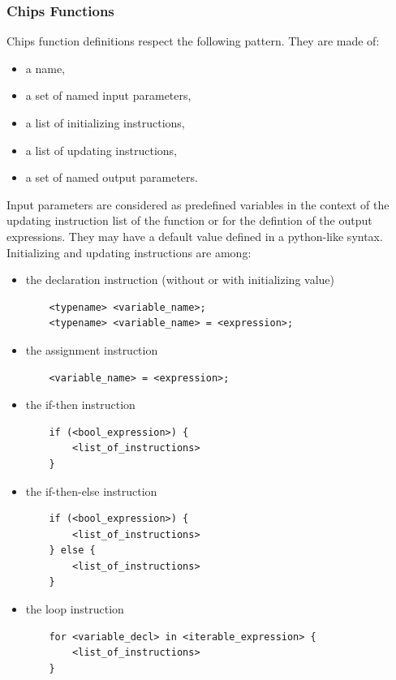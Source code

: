\documentclass{article}
\begin{document}
\subsubsection{Chips Functions}
\label{functions}
Chips function definitions respect the following pattern. They are made of:
\begin{itemize}
    \item a name,
    \item a set of named input parameters,
    \item a list of initializing instructions,
    \item a list of updating instructions,
    \item a set of named output parameters.
\end{itemize}
Input parameters are considered as predefined variables in the context of the updating instruction list of the function or for the defintion of the output expressions. They may have a default value defined in a python-like syntax. Initializing and updating instructions are among:
\begin{itemize}
    \item the declaration instruction (without or with initializing value)
\begin{verbatim}
    <typename> <variable_name>;
    <typename> <variable_name> = <expression>;\end{verbatim}
    \item the assignment instruction
\begin{verbatim}
    <variable_name> = <expression>;\end{verbatim}
    \item the if-then instruction
\begin{verbatim}
    if (<bool_expression>) {
        <list_of_instructions>
    }\end{verbatim}
    \item the if-then-else instruction
\begin{verbatim}
    if (<bool_expression>) {
        <list_of_instructions>
    } else {
        <list_of_instructions>
    }\end{verbatim}
    \item the loop instruction
\begin{verbatim}
    for <variable_decl> in <iterable_expression> {
        <list_of_instructions>
    }\end{verbatim}
\end{itemize}
\end{document}

